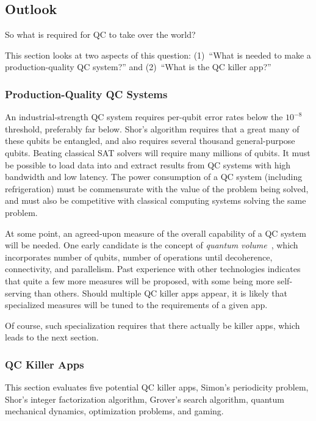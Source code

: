 \subsection{Outlook}
\label{sec:future:Outlook}

So what is required for QC to take over the world?

This section looks at two aspects of this question:
(1)~``What is needed to make a production-quality QC system?'' and
(2)~``What is the QC killer app?''

\subsubsection{Production-Quality QC Systems}
\label{sec:future:Production-Quality QC Systems}

An industrial-strength QC system requires per-qubit error rates below the
$10^{-8}$ threshold, preferably far below.
Shor's algorithm requires that a great many of these qubits be entangled,
and also requires several thousand general-purpose qubits.
Beating classical SAT solvers will require many millions of qubits.
It must be possible to load data into and extract results from QC
systems with high bandwidth and low latency.
The power consumption of a QC system (including refrigeration) must be
commensurate with the value of the problem being solved, and must also
be competitive with classical computing systems solving the same problem.

At some point, an agreed-upon measure of the overall capability of a
QC system will be needed.
One early candidate is the concept of
\emph{quantum volume}~\cite{LevSBishop2017QuantumVolume}, which
incorporates number of qubits, number of operations until decoherence,
connectivity, and parallelism.
Past experience with other technologies indicates that quite a few more
measures will be proposed, with some being more self-serving than others.
Should multiple QC killer apps appear, it is likely that specialized
measures will be tuned to the requirements of a given app.

Of course, such specialization requires that there actually be killer
apps, which leads to the next section.

\subsubsection{QC Killer Apps}
\label{sec:future:QC Killer Apps}

This section evaluates five potential QC killer apps,
Simon's periodicity problem,
Shor's integer factorization algorithm,
Grover's search algorithm,
quantum mechanical dynamics,
optimization problems, and
gaming.

